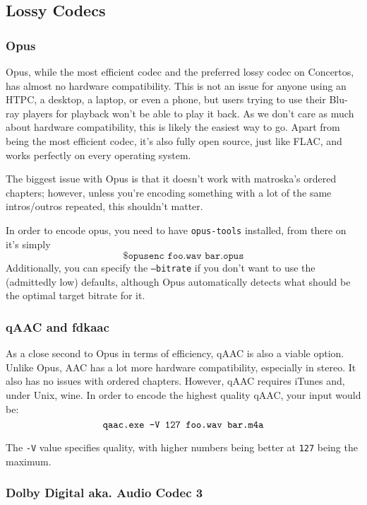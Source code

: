 \documentclass{scrartcl}
\begin{document}
\subsection{Lossy Codecs}

\subsubsection{Opus}

Opus, while the most efficient codec and the preferred lossy codec on Concertos, has almost no hardware compatibility.  This is not an issue for anyone using an HTPC, a desktop, a laptop, or even a phone, but users trying to use their Blu-ray players for playback won't be able to play it back.  As we don't care as much about hardware compatibility, this is likely the easiest way to go.  Apart from being the most efficient codec, it's also fully open source, just like FLAC, and works perfectly on every operating system.

The biggest issue with Opus is that it doesn't work with matroska's ordered chapters; however, unless you're encoding something with a lot of the same intros/outros repeated, this shouldn't matter.

In order to encode opus, you need to have \texttt{opus-tools} installed, from there on it's simply
\[
\texttt{\$ opusenc foo.wav bar.opus}
\]
Additionally, you can specify the \texttt{--bitrate} if you don't want to use the (admittedly low) defaults, although Opus automatically detects what should be the optimal target bitrate for it.

\subsubsection{qAAC and fdkaac}

As a close second to Opus in terms of efficiency, qAAC is also a viable option.  Unlike Opus, AAC has a lot more hardware compatibility, especially in stereo.  It also has no issues with ordered chapters.  However, qAAC requires iTunes and, under Unix, wine.  In order to encode the highest quality qAAC, your input would be:
\[
\texttt{qaac.\@exe -V 127 foo.wav bar.m4a}
\]

The \texttt{-V} value specifies quality, with higher numbers being better at \texttt{127} being the maximum.

\subsubsection{Dolby Digital aka. Audio Codec 3}
\end{document}
